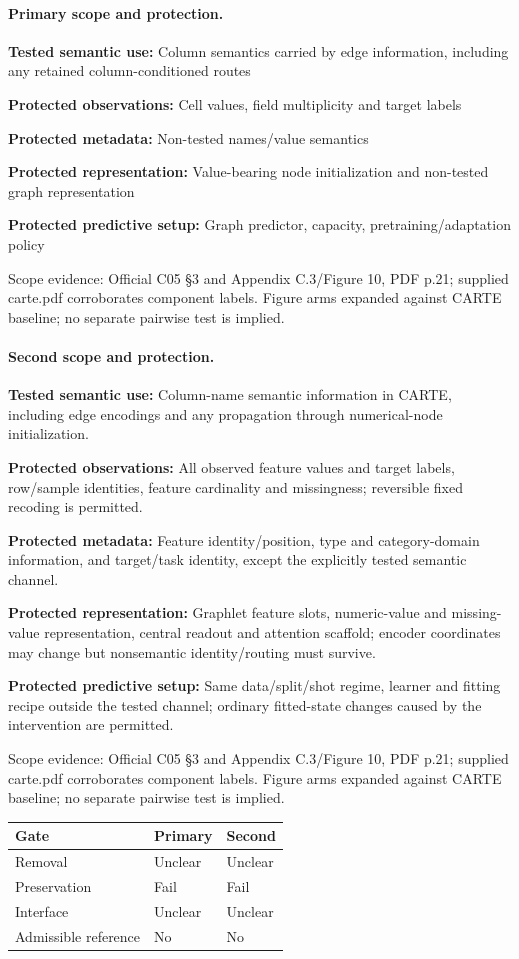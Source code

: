 \documentclass[10pt]{article}
\begin{document}
\paragraph{Primary scope and protection.}
\textbf{Tested semantic use:} Column semantics carried by edge information, including any retained column-conditioned routes\par
\textbf{Protected observations:} Cell values, field multiplicity and target labels\par
\textbf{Protected metadata:} Non-tested names/value semantics\par
\textbf{Protected representation:} Value-bearing node initialization and non-tested graph representation\par
\textbf{Protected predictive setup:} Graph predictor, capacity, pretraining/adaptation policy\par
Scope evidence: Official C05 §3 and Appendix C.3/Figure 10, PDF p.21; supplied carte.pdf corroborates component labels. Figure arms expanded against CARTE baseline; no separate pairwise test is implied.\par
\paragraph{Second scope and protection.}
\textbf{Tested semantic use:} Column-name semantic information in CARTE, including edge encodings and any propagation through numerical-node initialization.\par
\textbf{Protected observations:} All observed feature values and target labels, row/sample identities, feature cardinality and missingness; reversible fixed recoding is permitted.\par
\textbf{Protected metadata:} Feature identity/position, type and category-domain information, and target/task identity, except the explicitly tested semantic channel.\par
\textbf{Protected representation:} Graphlet feature slots, numeric-value and missing-value representation, central readout and attention scaffold; encoder coordinates may change but nonsemantic identity/routing must survive.\par
\textbf{Protected predictive setup:} Same data/split/shot regime, learner and fitting recipe outside the tested channel; ordinary fitted-state changes caused by the intervention are permitted.\par
Scope evidence: Official C05 §3 and Appendix C.3/Figure 10, PDF p.21; supplied carte.pdf corroborates component labels. Figure arms expanded against CARTE baseline; no separate pairwise test is implied.\par
\begin{tabular}{lll}\toprule Gate & Primary & Second \\ \midrule
Removal & Unclear & Unclear \\
Preservation & Fail & Fail \\
Interface & Unclear & Unclear \\
Admissible reference & No & No \\
\bottomrule\end{tabular}
\end{document}
